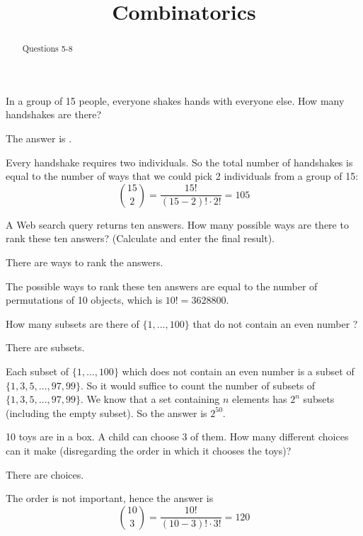 \documentclass{ximera}
\title{Combinatorics}
\begin{document}
\begin{abstract}
  Questions 5-8
\end{abstract}
\maketitle



\begin{question}
In a group of 15 people, everyone shakes hands with everyone else.
How many handshakes are there?
\begin{solution}
The answer is .
\end{solution}
Every handshake requires two individuals. So the total number of
handshakes is equal to the number of ways that we could pick 2
individuals from a group of 15:
\[
\binom{15}{2} = \frac{15!}{(15 - 2)! \cdot 2!} = 105
\]
\end{question}

\begin{question}
A Web search query returns ten answers. How many possible ways are
there to rank these ten answers? (Calculate and enter the final result).
\begin{solution}
There are  ways to rank the answers.
\end{solution}
The possible ways to rank these ten answers are equal to the number of
permutations of 10 objects, which is $10! = 3628800$.
\end{question}

\begin{question}
How many subsets are there of $\{1, ... , 100\}$ that do not contain
an even number ?
\begin{solution}
There are  subsets.
\end{solution}
Each subset of $\{1 , \ldots , 100\}$ which does not contain an even
number is a subset of $\{1, 3, 5, \ldots , 97, 99\}$. So it would
suffice to count the number of subsets of $\{1, 3, 5, \ldots , 97,
99\}$. We know that a set containing $n$ elements has $2^n$ subsets
(including the empty subset). So the answer is $2^{50}$.
\end{question}

\begin{question}
10 toys are in a box.  A child can choose 3 of them.  How many
different choices can it make (disregarding the order in which it
chooses the toys)?
\begin{solution}
There are  choices.
\end{solution}
The order is not important, hence the answer is
\[
\binom{10}{3} = \frac{10!}{(10-3)! \cdot 3!} = 120
\]
\end{question}
\end{document}
